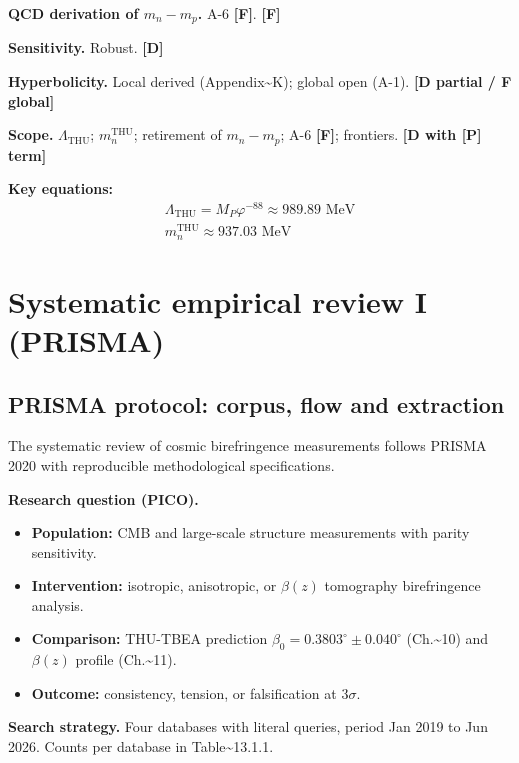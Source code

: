 ﻿\documentclass[11pt,letterpaper]{article}
\begin{document}
\textbf{QCD derivation of $m_n - m_p$.} A-6 \textbf{[F]}. \textbf{[F]}

\textbf{Sensitivity.} Robust. \textbf{[D]}

\textbf{Hyperbolicity.} Local derived (Appendix\textasciitilde{}K); global open (A-1). \textbf{[D partial / F global]}

\textbf{Scope.} $\Lambda_{\text{THU}}$; $m_n^{\text{THU}}$; retirement of $m_n - m_p$; A-6 \textbf{[F]}; frontiers. \textbf{[D with [P] term]}

\textbf{Key equations:}
\begin{align*}
    \Lambda_{\mathrm{THU}} = M_P \varphi^{-88} \approx 989.89 \text{ MeV} \\
    m_n^{\mathrm{THU}} \approx 937.03 \text{ MeV}
\end{align*}
\section{Systematic empirical review I (PRISMA)}
\subsection{PRISMA protocol: corpus, flow and extraction}
The systematic review of cosmic birefringence measurements follows PRISMA 2020 with reproducible methodological specifications.

\textbf{Research question (PICO).}

\begin{itemize}[leftmargin=*]
\item \textbf{Population:} CMB and large-scale structure measurements with parity sensitivity.
\item \textbf{Intervention:} isotropic, anisotropic, or $\beta(z)$ tomography birefringence analysis.
\item \textbf{Comparison:} THU-TBEA prediction $\beta_0 = 0{.}3803^\circ \pm 0{.}040^\circ$ (Ch.\textasciitilde{}10) and $\beta(z)$ profile (Ch.\textasciitilde{}11).
\item \textbf{Outcome:} consistency, tension, or falsification at $3\sigma$.
\end{itemize}

\textbf{Search strategy.} Four databases with literal queries, period Jan 2019 to Jun 2026. Counts per database in Table\textasciitilde{}13.1.1.
\end{document}
